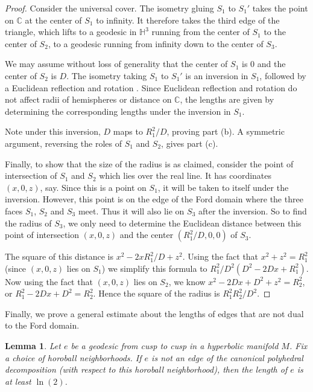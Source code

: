 \documentclass[11pt]{amsart}
\newcommand{\HH}{{\mathbb{H}}}
\newcommand{\CC}{{\mathbb{C}}}
\theoremstyle{plain}
\newtheorem{lemma}[theorem]{Lemma}
\theoremstyle{definition}
\begin{document}
\begin{proof}
Consider the universal cover.  The isometry gluing $S_1$ to $S_1'$
takes the point on $\CC$ at the center of $S_1$ to infinity.  It
therefore takes the third edge of the triangle, which lifts to a
geodesic in $\HH^3$ running from the center of $S_1$ to the center of
$S_2$, to a geodesic running from infinity down to the center of
$S_3$.

We may assume without loss of generality that the center of $S_1$ is
$0$ and the center of $S_2$ is $D$.  The isometry taking $S_1$ to
$S_1'$ is an inversion in $S_1$, followed by a Euclidean reflection
and rotation \cite{maskit}.  Since Euclidean reflection and rotation
do not affect radii of hemispheres or distance on $\CC$, the lengths
are given by determining the corresponding lengths under the inversion
in $S_1$.

Note under this inversion, $D$ maps to $R_1^2/D$, proving part (b).  A
symmetric argument, reversing the roles of $S_1$ and $S_2$, gives part
(c).

Finally, to show that the size of the radius is as claimed, consider
the point of intersection of $S_1$ and $S_2$ which lies over the real
line.  It has coordinates $(x, 0, z)$, say.  Since this is a point on
$S_1$, it will be taken to itself under the inversion.  However, this
point is on the edge of the Ford domain where the three faces $S_1$,
$S_2$ and $S_3$ meet.  Thus it will also lie on $S_3$ after the
inversion.  So to find the radius of $S_3$, we only need to determine
the Euclidean distance between this point of intersection $(x, 0, z)$
and the center $(R_1^2/D, 0, 0)$ of $S_3$.

The square of this distance is $x^2 -2xR_1^2/D + z^2$.  Using the fact
that $x^2 + z^2 = R_1^2$ (since $(x,0,z)$ lies on $S_1$) we simplify
this formula to $R_1^2/D^2(D^2-2Dx+R_1^2)$.  Now using the fact that
$(x,0,z)$ lies on $S_2$, we know $x^2 -2Dx + D^2 + z^2 = R_2^2$, or
$R_1^2 -2Dx + D^2 = R_2^2$.  Hence the square of the radius is
$R_1^2R_2^2/D^2$.  
\end{proof}

Finally, we prove a general estimate about the lengths of edges that
are not dual to the Ford domain.

\begin{lemma}\label{lemma:length-non-canonical}
Let $e$ be a geodesic from cusp to cusp in a hyperbolic manifold $M$.
Fix a choice of horoball neighborhoods.  If $e$ is not an edge of the
canonical polyhedral decomposition (with respect to this horoball
neighborhood), then the length of $e$ is at least $\ln(2)$.
\end{lemma}
\end{document}
